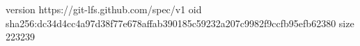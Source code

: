 version https://git-lfs.github.com/spec/v1
oid sha256:dc34d4cc4a97d38f77e678affab390185c59232a207c9982f9ccfb95efb62380
size 223239
